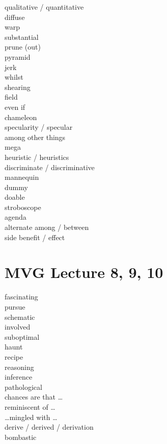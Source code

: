 \documentclass[12pt]{article}
\begin{document}
qualitative / quantitative  \\
diffuse \\
warp \\
substantial \\
prune (out) \\
pyramid \\
jerk \\
whilst \\
shearing \\
field \\
even if \\
chameleon \\
specularity / specular\\
among other things \\
mega \\
heuristic / heuristics \\
discriminate / discriminative \\
mannequin \\
dummy \\
doable \\
stroboscope \\
agenda \\
alternate among / between \\
side benefit / effect \\

\section*{MVG Lecture 8, 9, 10}
fascinating  \\
pursue  \\
schematic  \\
involved  \\
suboptimal  \\
haunt   \\
recipe   \\
reasoning   \\
inference   \\
pathological   \\
chances are that \dots   \\
reminiscent of \dots   \\
\dots mingled with \dots   \\
derive / derived / derivation   \\
bombastic  \\
\end{document}
